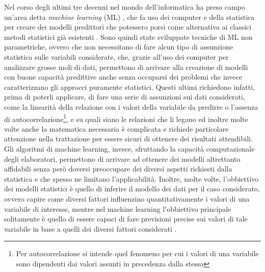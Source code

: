 \documentclass[a4paper]{report}
\begin{document}
Nel corso degli ultimi tre decenni nel mondo dell'informatica ha preso campo un'area detta \textit{machine learning} (ML)
, che fa uso dei computer e della statistica per creare dei modelli predittori che potessero porsi come alternativa ai classici metodi statistici già esistenti \cite{james2013introduction}. Sono quindi state sviluppate tecniche di ML non parametriche, ovvero che non necessitano di fare alcun tipo di assunzione statistica sulle variabili considerate, che, grazie all'uso dei computer per analizzare grosse moli di dati, permettono di arrivare alla creazione di modelli con buone capacità predittive anche senza occuparsi dei problemi che invece caratterizzano gli approcci puramente statistici. Questi ultimi richiedono infatti, prima di poterli applicare, di fare una serie di assunzioni
sui dati considerati, come la linearità della relazione con i valori della variabile da predirre o l'assenza di autocorrelazione\footnote{Per autocorrelazione si intende quel fenomeno per cui i valori di una variabile sono dipendenti dai valori assunti in precedenza dalla stessa}, e su quali siano le relazioni che li legano ed inoltre molte volte anche la matematica necessaria è complicata e richiede particolare attenzione nella trattazione per essere sicuri di ottenere dei risultati attendibili. Gli algoritmi di machine learning, invece, sfruttando la capacità computazionale degli elaboratori, permettono di arrivare ad ottenere dei modelli altrettanto affidabili senza però doversi preoccupare dei diversi aspetti richiesti dalla statistica e che spesso ne limitano l'applicabilità. Inoltre, molte volte, l'obbiettivo dei modelli statistici è quello di inferire il modello dei dati per il caso considerato, ovvero capire come diversi fattori influenzino quantitativamente i valori di una variabile di interesse, mentre nel machine learning l'obbiettivo principale solitamente è quello di essere capaci di fare previsioni precise sui valori di tale variabile in base a quelli dei diversi fattori considerati \cite{breiman2003statistical}. 
\end{document}
